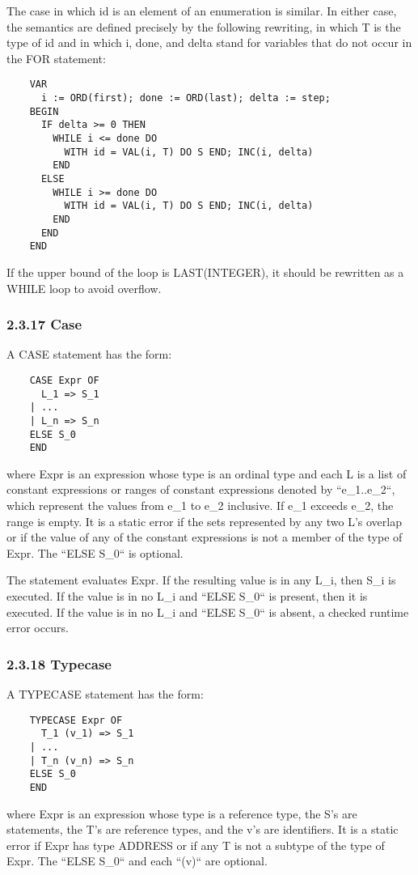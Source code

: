 \documentclass[10pt]{article}
\begin{document}
  The case in which id is an element of an enumeration is similar. In either case, the semantics are defined precisely by the following rewriting, in which T is the type of id and in which i, done, and delta stand for variables that do not occur in the FOR statement: 
\begin{verbatim}
    VAR
      i := ORD(first); done := ORD(last); delta := step;
    BEGIN
      IF delta >= 0 THEN
        WHILE i <= done DO 
          WITH id = VAL(i, T) DO S END; INC(i, delta)
        END
      ELSE
        WHILE i >= done DO
          WITH id = VAL(i, T) DO S END; INC(i, delta)
        END
      END
    END
\end{verbatim}



  If the upper bound of the loop is LAST(INTEGER), it should be rewritten as a WHILE loop to avoid overflow. 


 
\subsubsection*{2.3.17 Case}


  A CASE statement has the form: 
\begin{verbatim}
    CASE Expr OF  
      L_1 => S_1 
    | ...
    | L_n => S_n
    ELSE S_0 
    END
\end{verbatim}
 where Expr is an expression whose type is an ordinal type and each L is a list of constant expressions or ranges of constant expressions denoted by ``e\_1..e\_2``, which represent the values from e\_1 to e\_2 inclusive. If  e\_1 exceeds e\_2, the range is empty. It is a static error if the sets represented by any two L's overlap or if the value of any of the constant expressions is not a member of the type of Expr. The ``ELSE S\_0`` is optional. 


 The statement evaluates Expr. If the resulting value is in any L\_i, then S\_i is executed. If the value is in no L\_i and ``ELSE S\_0`` is present, then it is executed. If the value is in no L\_i and ``ELSE S\_0`` is absent, a checked runtime error occurs. 


 
\subsubsection*{2.3.18 Typecase}


  A TYPECASE statement has the form: 
\begin{verbatim}
    TYPECASE Expr OF
      T_1 (v_1) => S_1
    | ...
    | T_n (v_n) => S_n
    ELSE S_0
    END
\end{verbatim}
 where Expr is an expression whose type is a reference type, the S's are statements, the T's are reference types, and the v's are identifiers. It is a static error if  Expr has type ADDRESS or if any T is not a subtype of the type of Expr. The ``ELSE S\_0`` and each ``(v)`` are optional. 
\end{document}
